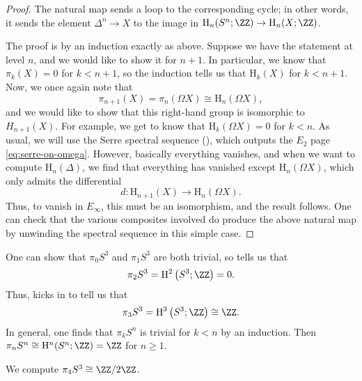 \documentclass[../notes.tex]{subfiles}
\begin{document}
\begin{proof}
	The natural map sends a loop to the corresponding cycle; in other words, it sends the element $\Delta^n\to X$ to the image in $\mathrm H_n(S^n;\ZZ)\to\mathrm H_n(X;\ZZ)$.
	
	The proof is by an induction exactly as above. Suppose we have the statement at level $n$, and we would like to show it for $n+1$. In particular, we know that $\pi_k(X)=0$ for $k<n+1$, so the induction tells us that $\mathrm H_k(X)$ for $k<n+1$. Now, we once again note that
	\[\pi_{n+1}(X)=\pi_n(\Omega X)\cong\mathrm H_n(\Omega X),\]
	and we would like to show that this right-hand group is isomorphic to $H_{n+1}(X)$. For example, we get to know that $\mathrm H_k(\Omega X)=0$ for $k<n$. As usual, we will use the Serre spectral sequence (), which outputs the $E_2$ page \eqref{eq:serre-on-omega}. However, basically everything vanishes, and when we want to compute $\mathrm H_n(\Delta)$, we find that everything has vanished except $\mathrm H_n(\Omega X)$, which only admits the differential
	\[d\colon\mathrm H_{n+1}(X)\to\mathrm H_n(\Omega X).\]
	Thus, to vanish in $E_\infty$, this must be an isomorphism, and the result follows. One can check that the various composites involved do produce the above natural map by unwinding the spectral sequence in this simple case.
\end{proof}
\begin{example}
	One can show that $\pi_0S^3$ and $\pi_1S^3$ are both trivial, so  tells us that
	\[\pi_2S^3=\mathrm H^2\left(S^3;\ZZ\right)=0.\]
	Thus,  kicks in to tell us that
	\[\pi_3S^3=\mathrm H^3\left(S^3;\ZZ\right)\cong\ZZ.\]
	In general, one finds that $\pi_kS^n$ is trivial for $k<n$ by an induction. Then $\pi_nS^n\cong\mathrm H^n(S^n;\ZZ)=\ZZ$ for $n\ge1$.
\end{example}
\begin{example} \label{ex:pi4-s3}
	We compute $\pi_4S^3\cong\ZZ/2\ZZ$.
\end{example}
\end{document}
